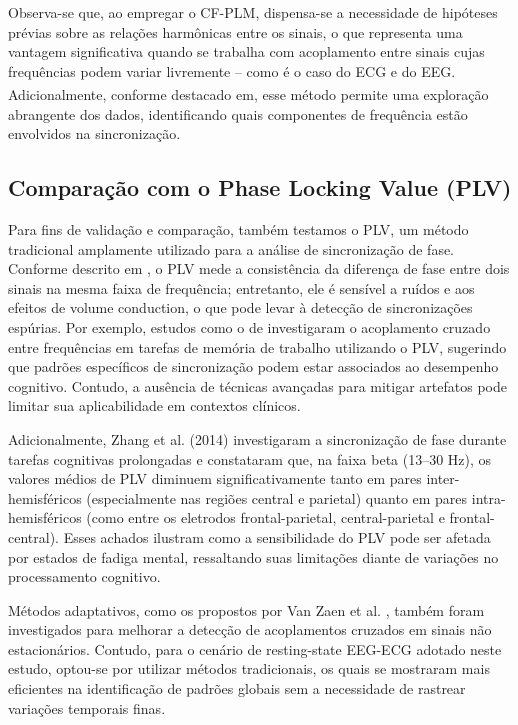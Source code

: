 Observa-se que, ao empregar o CF-PLM, dispensa-se a necessidade de hipóteses prévias sobre as relações harmônicas entre os sinais, o que representa uma vantagem significativa quando se trabalha com acoplamento entre sinais cujas frequências podem variar livremente – como é o caso do ECG e do EEG. Adicionalmente, conforme destacado em\textsuperscript{\cite{sorrentino2022}}, esse método permite uma exploração abrangente dos dados, identificando quais componentes de frequência estão envolvidos na sincronização.

\subsection{Comparação com o Phase Locking Value (PLV)}

Para fins de validação e comparação, também testamos o PLV, um método tradicional amplamente utilizado para a análise de sincronização de fase. Conforme descrito em \cite{seraj2018cerebral}, o PLV mede a consistência da diferença de fase entre dois sinais na mesma faixa de frequência; entretanto, ele é sensível a ruídos e aos efeitos de volume conduction, o que pode levar à detecção de sincronizações espúrias. Por exemplo, estudos como o de \cite{abubaker2021working} investigaram o acoplamento cruzado entre frequências em tarefas de memória de trabalho utilizando o PLV, sugerindo que padrões específicos de sincronização podem estar associados ao desempenho cognitivo. Contudo, a ausência de técnicas avançadas para mitigar artefatos pode limitar sua aplicabilidade em contextos clínicos.

Adicionalmente, Zhang et al. (2014) \cite{zhang2014phase} investigaram a sincronização de fase durante tarefas cognitivas prolongadas e constataram que, na faixa beta (13--30 Hz), os valores médios de PLV diminuem significativamente tanto em pares inter-hemisféricos (especialmente nas regiões central e parietal) quanto em pares intra-hemisféricos (como entre os eletrodos frontal-parietal, central-parietal e frontal-central). Esses achados ilustram como a sensibilidade do PLV pode ser afetada por estados de fadiga mental, ressaltando suas limitações diante de variações no processamento cognitivo.

Métodos adaptativos, como os propostos por Van Zaen et al. \cite{vanzaen2013adaptive}, também foram investigados para melhorar a detecção de acoplamentos cruzados em sinais não estacionários. Contudo, para o cenário de resting-state EEG-ECG adotado neste estudo, optou-se por utilizar métodos tradicionais, os quais se mostraram mais eficientes na identificação de padrões globais sem a necessidade de rastrear variações temporais finas.

